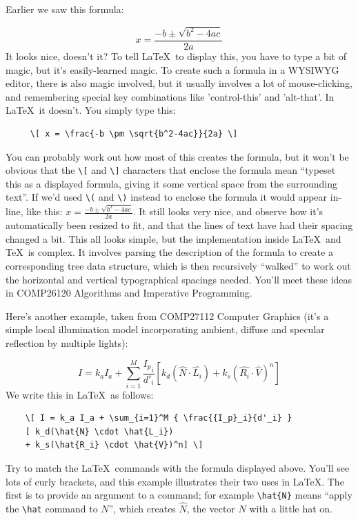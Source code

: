 Earlier we saw this formula:

\[ x = \frac{-b \pm \sqrt{b^2-4ac}}{2a} \]
It looks nice, doesn't it? To tell \LaTeX\ to display this, you have to type a bit of magic, but it's easily-learned magic. To create such a formula in a WYSIWYG editor, there is also magic involved, but it usually involves a lot of mouse-clicking, and remembering special key combinations like 'control-this' and 'alt-that'. In \LaTeX\ it doesn't. You simply type this:
\begin{verbatim}
     \[ x = \frac{-b \pm \sqrt{b^2-4ac}}{2a} \]
\end{verbatim}
You can probably work out how most of this creates the formula, but it won't be obvious that the \verb|\[| and  \verb|\]| characters that enclose the formula mean ``typeset this as a displayed formula, giving it some vertical space from the surrounding text''. If we'd used \verb|\(| and \verb|\)| instead to enclose the formula it would appear in-line, like this: \(  x = \frac{-b \pm \sqrt{b^2-4ac}}{2a} \). It still looks very nice, and observe how it's automatically been resized to fit, and that the lines of text have had their spacing changed a bit. This all looks simple, but the implementation inside \LaTeX\ and \TeX\ is complex. It involves parsing the description of the formula to create a corresponding tree data structure, which is then recursively ``walked'' to work out the horizontal and vertical typographical spacings needed. You'll meet these ideas in COMP26120 Algorithms and Imperative Programming.

Here's another example, taken from COMP27112 Computer Graphics (it's a simple local illumination model incorporating ambient, diffuse and specular reflection by multiple lights):

\[ I = k_a I_a + \sum_{i=1}^M {\frac{{I_p}_i}{d'_i}} [ k_d(\hat{N}\cdot\hat{L_i}) + k_s(\hat{R_i}\cdot\hat{V})^n] \]
%
We write this in \LaTeX\ as follows:

\begin{verbatim}
    \[ I = k_a I_a + \sum_{i=1}^M { \frac{{I_p}_i}{d'_i} }
    [ k_d(\hat{N} \cdot \hat{L_i}) 
    + k_s(\hat{R_i} \cdot \hat{V})^n] \]
\end{verbatim}
%
Try to match the \LaTeX\ commands with the formula displayed above. You'll see lots of curly brackets, and this example illustrates their two uses in \LaTeX. The first is to provide an argument to a command; for example \verb|\hat{N}| means ``apply the \verb|\hat| command to $N$'', which creates \(\hat{N}\), the vector \( N \) with a little hat  on.  

